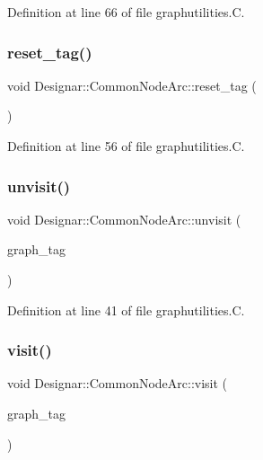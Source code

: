 Definition at line 66 of file graphutilities.\+C.

\mbox{\label{class_designar_1_1_common_node_arc_a436f2993d4da6ec9f750adc465e7c691}} 
\subsubsection{\texorpdfstring{reset\+\_\+tag()}{reset\_tag()}}
{\footnotesize\ttfamily void Designar\+::\+Common\+Node\+Arc\+::reset\+\_\+tag (\begin{DoxyParamCaption}{ }\end{DoxyParamCaption})}



Definition at line 56 of file graphutilities.\+C.

\mbox{\label{class_designar_1_1_common_node_arc_ae8f3fed57cacf9e8cfa0df582eeecf3b}} 
\subsubsection{\texorpdfstring{unvisit()}{unvisit()}}
{\footnotesize\ttfamily void Designar\+::\+Common\+Node\+Arc\+::unvisit (\begin{DoxyParamCaption}\item[{\hyperlink{namespace_designar_ac91366256ea6ea6ac5fd483d55a7499e}{Graph\+Tag}}]{graph\+\_\+tag }\end{DoxyParamCaption})}



Definition at line 41 of file graphutilities.\+C.

\mbox{\label{class_designar_1_1_common_node_arc_a14b77740fb6d68b1949483c71dd4b197}} 
\subsubsection{\texorpdfstring{visit()}{visit()}}
{\footnotesize\ttfamily void Designar\+::\+Common\+Node\+Arc\+::visit (\begin{DoxyParamCaption}\item[{\hyperlink{namespace_designar_ac91366256ea6ea6ac5fd483d55a7499e}{Graph\+Tag}}]{graph\+\_\+tag }\end{DoxyParamCaption})}



